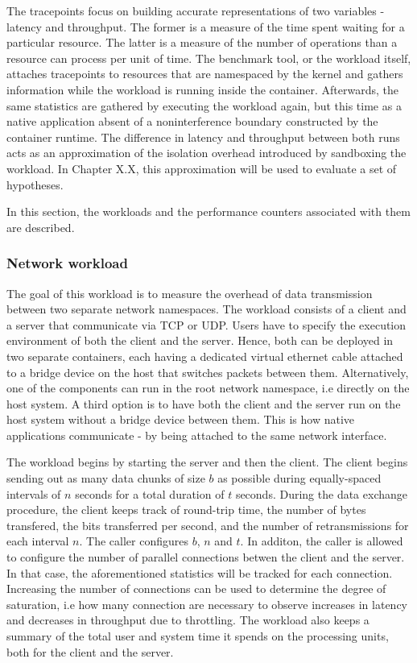 The tracepoints focus on building accurate representations of two variables - latency and throughput. 
The former is a measure of the time spent waiting for a particular resource. The latter 
is a measure of the number of operations than a resource can process per unit of time.
The benchmark tool, or the workload itself, attaches tracepoints to resources 
that are namespaced by the kernel and gathers information while the workload is running inside 
the container. Afterwards, the same statistics are gathered by executing the workload again, but this time 
as a native application absent of a noninterference boundary constructed by the container runtime. 
The difference in latency and throughput between both runs acts as an approximation of the isolation 
overhead introduced by sandboxing the workload. In Chapter X.X, this approximation will be used 
to evaluate a set of hypotheses. 

In this section, the workloads and the performance counters associated with them are described. 

\subsubsection{Network workload}
The goal of this workload is to measure the overhead of data transmission between 
two separate network namespaces. The workload consists of a client and a server that communicate 
via TCP or UDP. Users have to specify the execution environment of both the client 
and the server. Hence, both can be deployed in two separate containers, each having a dedicated
virtual ethernet cable attached to a bridge device on the host that switches packets between them.
Alternatively, one of the components can run 
in the root network namespace, i.e directly on the host system. A third option is to have both 
the client and the server run on the host system without a bridge device between them. This is how 
native applications communicate - by being attached to the same network interface. 

The workload begins by starting the server and then the client. The client begins sending out as many 
data chunks of size $b$ as possible during equally-spaced intervals of $n$ seconds for a total 
duration of $t$ seconds.
During the data exchange procedure, the client keeps track of round-trip time, the number 
of bytes transfered, the bits transferred per second, and the number of retransmissions for each interval $n$. 
The caller configures $b$, $n$ and $t$. In additon, the caller is allowed to configure the number 
of parallel connections betwen the client and the server. In that case, the aforementioned 
statistics will be tracked for each connection. Increasing the number of connections can be used to
determine the degree of saturation, i.e how many connection are necessary to 
observe increases in latency and decreases in throughput due to throttling.
The workload also keeps a summary of the total user and system time it spends on the processing units,
both for the client and the server.

